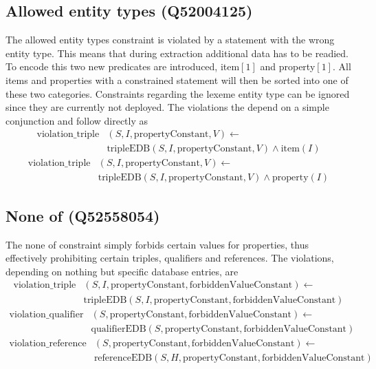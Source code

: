 \documentclass[hyperref,bachelorofscience,fleqn]{cgvpub}
\begin{document}
\subsection{Allowed entity types (Q52004125)}
The allowed entity types constraint is violated by a statement with the wrong entity type. This means that during extraction additional data has to be readied. To encode this two new predicates are introduced, item\([1]\) and property\([1]\). All items and properties with a constrained statement will then be sorted into one of these two categories. Constraints regarding the lexeme entity type can be ignored since they are currently not deployed. The violations the depend on a simple conjunction and follow directly as
\begin{equation*}
\begin{split}
\text{violation\_triple}&(S, I, \text{propertyConstant}, V) \leftarrow \\
&\text{tripleEDB}(S, I, \text{propertyConstant}, V) \wedge \text{item}(I)
\end{split}
\end{equation*}
\begin{equation*}
\begin{split}
\text{violation\_triple}&(S, I, \text{propertyConstant}, V) \leftarrow \\
&\text{tripleEDB}(S, I, \text{propertyConstant}, V) \wedge \text{property}(I)
\end{split}
\end{equation*}

\subsection{None of (Q52558054)}
The none of constraint simply forbids certain values for properties, thus effectively prohibiting certain triples, qualifiers and references. The violations, depending on nothing but specific database entries, are
\begin{equation*}
\begin{split}
\text{violation\_triple}&(S, I, \text{propertyConstant}, \text{forbiddenValueConstant}) \leftarrow \\
&\text{tripleEDB}(S, I, \text{propertyConstant}, \text{forbiddenValueConstant})
\end{split}
\end{equation*}
\begin{equation*}
\begin{split}
\text{violation\_qualifier}&(S, \text{propertyConstant}, \text{forbiddenValueConstant}) \leftarrow \\
&\text{qualifierEDB}(S, \text{propertyConstant}, \text{forbiddenValueConstant})
\end{split}
\end{equation*}
\begin{equation*}
\begin{split}
\text{violation\_reference}&(S, \text{propertyConstant}, \text{forbiddenValueConstant}) \leftarrow \\
&\text{referenceEDB}(S, H, \text{propertyConstant}, \text{forbiddenValueConstant})
\end{split}
\end{equation*}
\end{document}
